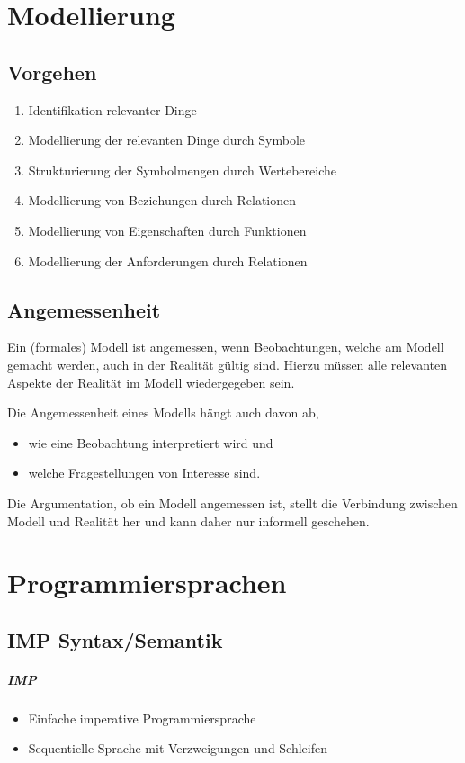 \chapter{Modellierung}
    \section{Vorgehen}
	    \begin{enumerate}
	    	\item Identifikation relevanter Dinge
	    	\item Modellierung der relevanten Dinge durch Symbole
	    	\item Strukturierung der Symbolmengen durch Wertebereiche
	    	\item Modellierung von Beziehungen durch Relationen
	    	\item Modellierung von Eigenschaften durch Funktionen
	    	\item Modellierung der Anforderungen durch Relationen
	    \end{enumerate}
    
    \section{Angemessenheit}
	    Ein (formales) Modell ist angemessen, wenn Beobachtungen, welche am Modell gemacht werden, auch in der Realität gültig sind. Hierzu müssen alle relevanten Aspekte der Realität im Modell wiedergegeben sein.
	    
	    Die Angemessenheit eines Modells hängt auch davon ab,
	    \begin{itemize}
	    	\item wie eine Beobachtung interpretiert wird und
	    	\item welche Fragestellungen von Interesse sind.
	    \end{itemize}
	    
	    Die Argumentation, ob ein Modell angemessen ist, stellt die Verbindung zwischen Modell und Realität her und kann daher nur informell geschehen.

\chapter{Programmiersprachen}
    \section{IMP Syntax/Semantik}
	    \paragraph{IMP}
		    \begin{itemize}
		    	\item Einfache imperative Programmiersprache
		    	\item Sequentielle Sprache mit Verzweigungen und Schleifen
		    \end{itemize}
	    
